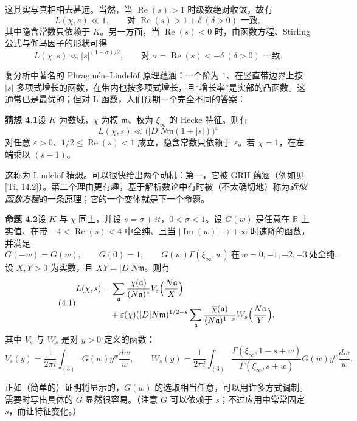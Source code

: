 这其实与真相相去甚远。当然，当 $\operatorname{Re}(s)>1$ 时级数绝对收敛，故有
\[
L(\chi,s)\ll1,\qquad\text{对 }\operatorname{Re}(s)>1+\delta\ (\delta>0)\text{ 一致},
\]
其中隐含常数只依赖于 $K$。另一方面，当 $\operatorname{Re}(s)<0$ 时，由函数方程、Stirling 公式与伽马因子的形状可得
\[
L(\chi,s)\ll|s|^{(1-\sigma)/2},\qquad\text{对 }\sigma=\operatorname{Re}(s)<-\delta\ (\delta>0)\text{ 一致}.
\]

复分析中著名的 Phragmén--Lindelöf 原理蕴涵：一个阶为 $1$、在竖直带边界上按 $|s|$ 多项式增长的函数，在带内也按多项式增长，且“增长率”是实部的凸函数。这通常已是最优的；但对 L 函数，人们预期一个完全不同的答案：

\par\medskip\noindent\textbf{猜想 4.1}\quad 设 $K$ 为数域，$\chi$ 为模 $\mathfrak{m}$、权为 $\xi_\infty$ 的 Hecke 特征。则有
\[
L(\chi,s)\ll\bigl(|D|N\mathfrak{m}(1+|s|)\bigr)^{\varepsilon}
\]
对任意 $\varepsilon>0$、$1/2\le\operatorname{Re}(s)<1$ 成立，隐含常数只依赖于 $\varepsilon$。若 $\chi=1$，在左端乘以 $(s-1)$。

这称为 Lindelöf 猜想。可以很快给出两个动机：第一，它被 GRH 蕴涵（例如见 [Ti, 14.2]）。第二个理由更有趣，基于解析数论中有时被（不太确切地）称为\emph{近似函数方程}的一条原理；它的一个变体就是下一个命题。

\par\medskip\noindent\textbf{命题 4.2}\quad 设 $K$ 与 $\chi$ 同上，并设 $s=\sigma+it$，$0<\sigma<1$。设 $G(w)$ 是任意在 $\mathbb{R}$ 上实值、在带 $-4<\operatorname{Re}(s)<4$ 中全纯、且当 $|\operatorname{Im}(w)|\to+\infty$ 时速降的函数，并满足
\[
G(-w)=G(w),\qquad G(0)=1,\qquad G(w)\Gamma(\xi_\infty,w)\ \text{在}\ w=0,-1,-2,-3\ \text{处全纯}.
\]
设 $X,Y>0$ 为实数，且 $XY=|D|N\mathfrak{m}$。则有
\begin{equation}\tag{4.1}\label{c2:eq:4.1}
\begin{aligned}
L(\chi,s)&=\sum_{\mathfrak{a}}\frac{\chi(\mathfrak{a})}{(N\mathfrak{a})^s}V_s\Bigl(\frac{N\mathfrak{a}}{X}\Bigr)\\
&\quad+\varepsilon(\chi)(|D|N\mathfrak{m})^{1/2-s}\sum_{\mathfrak{a}}\frac{\overline{\chi}(\mathfrak{a})}{(N\mathfrak{a})^{1-s}}W_s\Bigl(\frac{N\mathfrak{a}}{Y}\Bigr),
\end{aligned}
\end{equation}
其中 $V_s$ 与 $W_s$ 是对 $y>0$ 定义的函数：
\[
V_s(y)=\frac{1}{2\pi i}\int_{(3)}G(w)y^w\frac{dw}{w},\qquad
W_s(y)=\frac{1}{2\pi i}\int_{(3)}\frac{\Gamma(\xi_\infty,1-s+w)}{\Gamma(\xi_\infty,s+w)}G(w)y^w\frac{dw}{w}.
\]

正如（简单的）证明将显示的，$G(w)$ 的选取相当任意，可以用许多方式调制。需要时写出具体的 $G$ 显然很容易。（注意 $G$ 可以依赖于 $s$；不过应用中常常固定 $s$，而让特征变化。）

